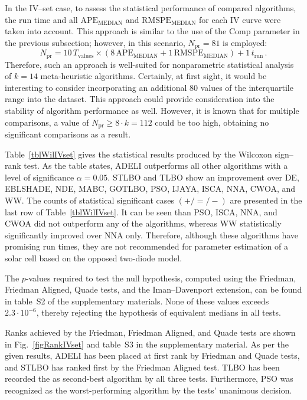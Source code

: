 \documentclass[a4paper,fleqn]{cas-sc}
\begin{document}
In the IV--set case, to assess the statistical performance of compared algorithms,
the run time and all $\mathrm{APE}_\mathrm{MEDIAN}$ and $\mathrm{RMSPE}_\mathrm{MEDIAN}$ for each IV curve were taken into account.
This approach is similar to the use of the Comp parameter in the previous subsection;
however, in this scenario, $N_\mathrm{pr}=81$ is employed:
\begin{equation*}
N_\mathrm{pr}= 10\,T_\mathrm{values}\times(8\,\mathrm{APE}_\mathrm{MEDIAN}+1\,\mathrm{RMSPE}_\mathrm{MEDIAN})+1\,t_\mathrm{run}\,.
\end{equation*}
Therefore, such an approach is well-suited for nonparametric statistical analysis of $k=14$ meta-heuristic algorithms.
Certainly, at first sight, it would be interesting to consider incorporating an additional 80 values of the interquartile range into the dataset.
This approach could provide consideration into the stability of algorithm performance as well.
However, it is known \cite{Derrac2011} that for multiple comparisons, a value of $N_\mathrm{pr}\geq 8\cdot k=112$ could be too high, obtaining
no significant comparisons as a result.

Table~\ref{tblWilIVset}  gives the statistical results produced by the Wilcoxon sign--rank test.
As the table states, ADELI outperforms all other algorithms with a level of significance $\alpha = 0.05$.
STLBO and TLBO show an improvement over
DE, EBLSHADE, NDE, MABC, GOTLBO, PSO, IJAYA, ISCA, NNA, CWOA, and WW.
The counts of statistical significant cases $(+/=/-)$ are presented in the last row of Table~\ref{tblWilIVset}.
It can be seen than PSO, ISCA, NNA, and CWOA did not outperform any of the algorithms,
whereas WW statistically significantly improved over  NNA only.
Therefore, although these algorithms have promising run times,
they are not recommended for parameter estimation of a solar cell based on the opposed two-diode model.

The $p$-values required to test the null hypothesis,
computed using the Friedman, Friedman Aligned, Quade tests, and the Iman--Davenport extension,
can be found in table~S2 of the supplementary materials.
None of these values exceeds $2.3\cdot10^{-6}$, thereby rejecting the hypothesis of equivalent medians in all tests.

Ranks achieved by the Friedman, Friedman Aligned, and Quade tests are shown in Fig.~\ref{figRankIVset} and table~S3 in the supplementary material.
As per the given results, ADELI has been placed at first rank by Friedman and Quade tests,
and STLBO has ranked first by the Friedman Aligned test.
TLBO has been recorded the as second-best algorithm by all three tests.
Furthermore, PSO was recognized as the worst-performing algorithm by the tests' unanimous decision.
\end{document}
